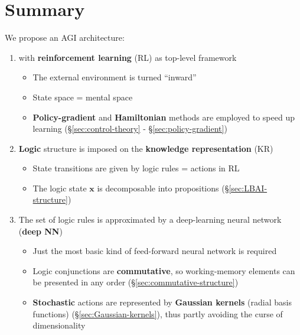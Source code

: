 \documentclass[orivec]{llncs}
\newcommand{\vect}[1]{\boldsymbol{#1}}
\begin{document}



\setcounter{section}{-1}
\section{Summary}
\label{sec:0}

We propose an AGI architecture:
\begin{enumerate}
	\item with \textbf{reinforcement learning} (RL) as top-level framework
	\begin{itemize}
		\item The external environment is turned ``inward''
		\item State space = mental space
		\item \textbf{Policy-gradient} and \textbf{Hamiltonian} methods are employed to speed up learning (\S\ref{sec:control-theory} - \S\ref{sec:policy-gradient})
	\end{itemize}
	\item \textbf{Logic} structure is imposed on the \textbf{knowledge representation} (KR)
		\begin{itemize}
		\item State transitions are given by logic rules = actions in RL
		\item The logic state $\vect{x}$ is decomposable into propositions (\S\ref{sec:LBAI-structure})
		\end{itemize}
	\item The set of logic rules is approximated by a deep-learning neural network (\textbf{deep NN})
		\begin{itemize}
		\item Just the most basic kind of feed-forward neural network is required
		\item Logic conjunctions are \textbf{commutative}, so working-memory elements can be presented in any order (\S\ref{sec:commutative-structure})
		\item \textbf{Stochastic} actions are represented by \textbf{Gaussian kernels} (radial basis functions) (\S\ref{sec:Gaussian-kernels}), thus partly avoiding the curse of dimensionality
	\end{itemize}
\end{enumerate}
\end{document}
